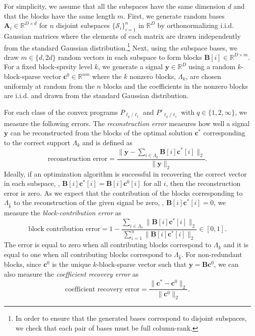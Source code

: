 \documentclass[10pt,twocolumn,twoside] {IEEEtran}
\begin{document}
{For simplicity, we assume that all the subspaces have the same dimension $d$ and that the blocks have the same length $m$. First, we generate random bases ${\boldsymbol{A}}_i \in {\mathbb{R}}^{D \times d}$ for $n$ disjoint subspaces $\{\mathcal{S}_i\}_{i=1}^{n}$ in ${\mathbb{R}}^D$ by orthonormalizing i.i.d. Gaussian matrices where the elements of each matrix are drawn independently from the standard Gaussian distribution.\footnote{In order to ensure that the generated bases correspond to disjoint subspaces, we check that each pair of bases must be full column-rank.} Next, using the subspace bases, we draw $m \in \{d, 2d\}$ random vectors in each subspace to form blocks ${\boldsymbol{B}}[i] \in {\mathbb{R}}^{D \times m}$. 
For a fixed block-sprsity level $k$, we generate a signal ${\boldsymbol{y}} \in {\mathbb{R}}^D$ using a random $k$-block-sparse vector ${\boldsymbol{c}}^0 \in {\mathbb{R}}^{nm}$ where the $k$ nonzero blocks, $\Lambda_k$, are chosen uniformly at random from the $n$ blocks and the coefficients in the nonzero blocks are i.i.d. and drawn from the standard Gaussian distribution.

For each class of the convex programs $P_{\ell_q/\ell_1}$ and $P'_{\ell_q/\ell_1}$ with $q \in \{1,2,\infty\}$, we measure the following errors. The \emph{reconstruction error} measures how well a signal ${\boldsymbol{y}}$ can be reconstructed from the blocks of the optimal solution ${\boldsymbol{c}}^*$ corresponding to the correct support $\Lambda_k$ and is defined as
\begin{equation}
\label{eq:RecErr}
\text{reconstruction error} = \frac{ \| {\boldsymbol{y}} - \sum_{i \in \Lambda_k}{{\boldsymbol{B}}[i]} {\boldsymbol{c}}^*[i] \|_2} {\| {\boldsymbol{y}} \|_2}.
\end{equation}
Ideally, if an optimization algorithm is successful in recovering the correct vector in each subspace, {}, ${\boldsymbol{B}}[i]{\boldsymbol{c}}^*[i] = {\boldsymbol{B}}[i]{\boldsymbol{c}}^0[i]$ for all $i$, then the reconstruction error is zero.  As we expect that the contribution of the blocks corresponding to $\Lambda_{\widehat{k}}$ to the reconstruction of the given signal be zero, {}, ${\boldsymbol{B}}[i] {\boldsymbol{c}}^*[i] = 0$, we measure the \emph{block-contribution error} as
\begin{equation}
\label{eq:BlkErr}
\text{block contribution error} =  1 - \frac{\sum_{i \in \Lambda_k} \| {\boldsymbol{B}}[i] {\boldsymbol{c}}^*[i] \|_2}{\sum_{i=1}^{n} \| {\boldsymbol{B}}[i] {\boldsymbol{c}}^*[i] \|_2} \in [0,1].
\end{equation}
The error is equal to zero when all contributing blocks correspond to $\Lambda_k$ and it is equal to one when all contributing blocks correspond to $\Lambda_{\widehat{k}}$. For non-redundant blocks, since ${\boldsymbol{c}}^0$ is the unique $k$-block-sparse vector such that ${\boldsymbol{y}} = {\boldsymbol{B}} {\boldsymbol{c}}^0$, we can also measure the \emph{coefficient recovery error} as 
\begin{equation}
\label{eq:CofErr}
\text{coefficient recovery error} = \frac{\| {\boldsymbol{c}}^* - {\boldsymbol{c}}^0 \|_2} {\| {\boldsymbol{c}}^0 \|_2}.
\end{equation}

}
\end{document}
